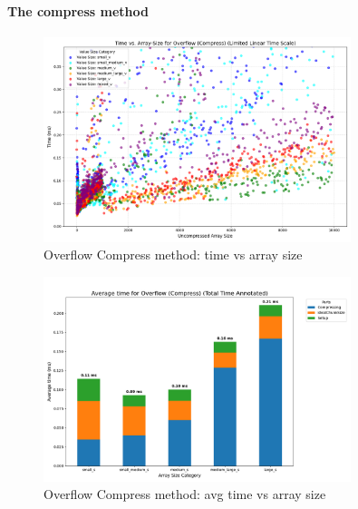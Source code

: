 \documentclass[11pt, a4paper]{article}
\begin{document}
	\paragraph{The compress method}
	\begin{figure}[H]%
		\centering
		\includegraphics[width=0.8\textwidth]{Grafics/Overflow/OverflowCompressTimevsSize.png}
		\caption{Overflow Compress method: time vs array size}
		\label{fig:23}
		
	\end{figure}
	\begin{figure}[H]%
		\centering
		\includegraphics[width=0.8\textwidth]{Grafics/Overflow/OverflowCompressTime.png}
		\caption{Overflow Compress method: avg time vs array size}
		\label{fig:24}
	\end{figure}
	
\end{document}
